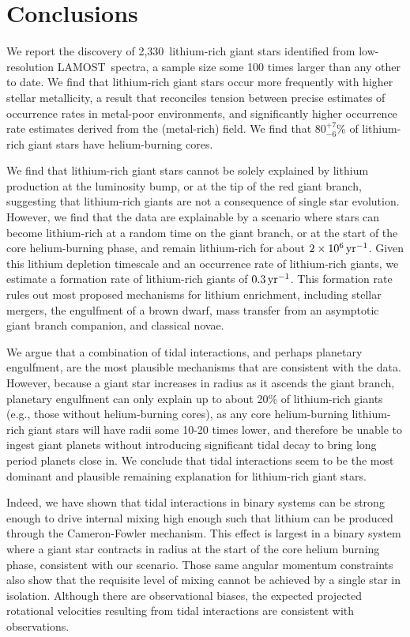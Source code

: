 \documentclass[twocolumn]{aastex62}
\newcommand{\SampleSize}{2,330}
\newcommand\lamost{LAMOST}
\begin{document}
\section{Conclusions} \label{sec:conclusions}

We report the discovery of \SampleSize\ lithium-rich giant stars identified
from low-resolution \lamost\ spectra, a sample size some 100 times larger than any other to date.
We find that lithium-rich giant stars occur more frequently with higher stellar 
metallicity, a result that reconciles tension between precise estimates of occurrence
rates in metal-poor environments, and significantly higher occurrence rate estimates
derived from the (metal-rich) field. We find that $80^{+7}_{-6}$\% of lithium-rich 
giant stars have helium-burning cores.

We find that lithium-rich giant stars cannot be solely explained by lithium production
at the luminosity bump, or at the tip of the red giant branch, suggesting that 
lithium-rich giants are not a consequence of single star evolution. However, we find
that the data are explainable by a scenario where stars can become lithium-rich 
at a random time on the giant branch, or at the start of the core helium-burning
phase, and remain lithium-rich for about $2\times10^{6}\,{\rm yr}^{-1}$. 
Given this lithium depletion timescale and an occurrence rate of lithium-rich giants, 
we estimate a formation rate of lithium-rich giants of $0.3\,{\rm yr}^{-1}$. This
formation rate rules out most proposed mechanisms for lithium enrichment, including
stellar mergers, the engulfment of a brown dwarf, mass transfer from an asymptotic 
giant branch companion, and classical novae.


We argue that a combination of tidal interactions, and perhaps planetary engulfment, 
are the most plausible mechanisms that are consistent with the data. However,
because a giant star increases in radius as it ascends the giant branch, 
planetary engulfment can only explain up to about 20\% of lithium-rich giants 
(e.g., those without helium-burning cores), as any core helium-burning lithium-rich
giant stars will have radii some 10-20 times lower, and therefore be unable to ingest giant planets without introducing significant tidal decay to bring long period planets close in.
We conclude that tidal interactions seem to be the most dominant and plausible
remaining explanation for lithium-rich giant stars.


Indeed, we have shown that tidal interactions in binary systems can be strong enough
to drive internal mixing high enough such that lithium can be produced through the 
Cameron-Fowler mechanism. This effect is largest in a binary system where a giant star 
contracts in radius at the start of the core helium burning phase, consistent with
our scenario.
Those same angular momentum constraints also show that the
requisite level of mixing cannot be achieved by a single star in isolation. Although
there are observational biases, the expected projected rotational velocities 
resulting from tidal interactions are consistent with observations.
\end{document}

